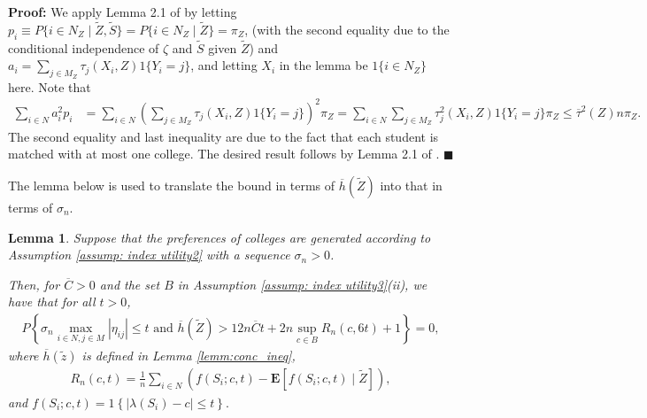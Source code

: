 \documentclass[12pt, fullpage]{amsart}
\newtheorem{lemma}{Lemma}[section]
\theoremstyle{definition}
\theoremstyle{definition}
\theoremstyle{definition}
\begin{document}
\begin{bibunit}[econometrica]
\noindent \textbf{Proof: } We apply Lemma 2.1 of \cite{Chung/Lu:AC:2002} by letting $p_i \equiv P\{i \in N_Z \mid \tilde Z, \tilde S\} = P\{i \in N_Z \mid \tilde Z\} = \pi_Z$, (with the second equality due to the conditional independence of $\zeta$ and $\tilde S$ given $\tilde Z$) and $a_i = \sum_{j \in M_Z} \tau_j(X_i,Z)1\{Y_i = j\}$, and letting $X_i$ in the lemma be $1\{i \in N_Z\}$ here. Note that 
\begin{align*}
	\sum_{i \in N} a_i^2 p_i &= \sum_{i \in N} \left(\sum_{j \in M_Z} \tau_j(X_i,Z)1\{Y_i = j\}\right)^2 \pi_Z = \sum_{i \in N} \sum_{j \in M_Z} \tau_j^2(X_i,Z)1\{Y_i = j\} \pi_Z  \le \overline \tau^2(Z) n \pi_Z.
\end{align*}
The second equality and last inequality are due to the fact that each student is matched with at most one college. The desired result follows by Lemma 2.1 of \cite{Chung/Lu:AC:2002}. $\blacksquare$\medskip


The lemma below is used to translate the bound in terms of $\overline h(\tilde Z)$ into that in terms of $\sigma_n$.

\begin{lemma}\label{lemma:heterogeneity_index_under_additive_preferences}
	Suppose that the preferences of colleges are generated according
	to Assumption \ref{assump: index utility2} with a sequence $\sigma_n>0$. 
	
	Then, for $\overline C>0$ and the set $B$ in Assumption \ref{assump: index utility3}(ii), we have that for all $t>0$,
	\begin{align}
		\label{eq:growth_of_h_index}
		P\left\{ \sigma_n \max_{i \in N,j \in M} |\eta_{ij}| \le t \text{  and  } \overline{h}(\tilde Z) > 12 n \overline C t + 2 n \sup_{c \in B} R_n(c, 6 t) + 1 \right\} = 0,
	\end{align}
    where $\overline{h}(\tilde z)$ is defined in Lemma \ref{lemm:conc_ineq},
    \begin{align*}
    	R_n(c,t) = \frac{1}{n}\sum_{i \in N} \left( f(S_i;c,t) - \mathbf{E} \left[f(S_i;c,t) \mid \tilde Z \right] \right),
    \end{align*}
    and $f(S_i;c,t) = 1\left\{|\lambda(S_i) - c| \le t \right\}.$
\end{lemma}


\end{bibunit}
\end{document}
